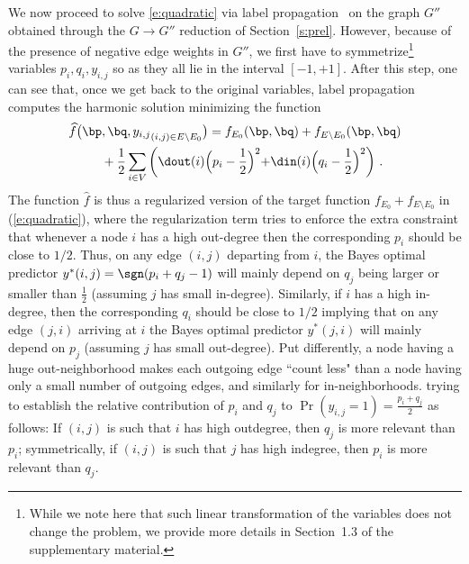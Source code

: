 We now proceed to solve \eqref{e:quadratic} via label propagation~\cite{LabelPropa03} on the graph $G''$ obtained through the $G \rightarrow G''$ reduction of Section~\ref{s:prel}.%
However, because of the presence of negative edge weights in $G''$, we first have to symmetrize\footnote{%
While we note here that such linear transformation of the variables does not change the problem, we provide more details in Section~1.3 of the supplementary material.} variables $p_i, q_i, y_{i,j}$ so as they all lie in the interval $[-1,+1]$.
After this step, one can 
see that, once we get back to the original variables, label propagation computes the harmonic solution minimizing the function
%
\begin{align*}
{\widehat f}&\big(\bp,\bq,{y_{i,j}}_{(i,j) \in E\setminus E_0}\big)
= f_{E_0}(\bp,\bq) + f_{E\setminus E_0}(\bp,\bq)\\ 
& \qquad + \frac{1}{2}\sum_{i\in V} \left(\dout(i)\Bigl(p_i-\frac{1}{2}\Bigl)^2+\din(i)\Bigl(q_i-\frac{1}{2}\Bigl)^2\right)\,.
\end{align*}
%
The function ${\widehat f}$ is thus a regularized version of the target function $f_{E_0} + f_{E\setminus E_0}$ in (\ref{e:quadratic}), where the regularization term 
tries to enforce the extra constraint that whenever a node $i$ has a high out-degree then the corresponding $p_i$ should be close to $1/2$. Thus, on any edge $(i,j)$ departing from $i$, the Bayes optimal predictor $y^*(i,j) = \sgn(p_i+q_j-1)$ will mainly depend on $q_j$ being larger or smaller than $\tfrac{1}{2}$ (assuming $j$ has small in-degree). Similarly, if $i$ has a high in-degree, then the corresponding $q_i$ should be close to $1/2$ implying that on any edge $(j,i)$ arriving at $i$ the Bayes optimal predictor $y^*(j,i)$ will mainly depend on $p_j$ (assuming $j$ has small out-degree). Put differently, a node having a huge out-neighborhood makes each outgoing edge ``count less" than a node having only a small number of outgoing edges, and similarly for in-neighborhoods.
%
%
\iffalse
trying to establish the relative contribution of $p_i$ and $q_j$ to $\Pr(y_{i,j}=1) = \frac{p_i+q_j}{2}$  as follows: If $(i,j)$ is such that $i$ has high outdegree, then $q_j$ is more relevant than $p_i$; symmetrically, if  $(i,j)$ is such that $j$ has high indegree, then $p_i$ is more relevant than $q_j$.
